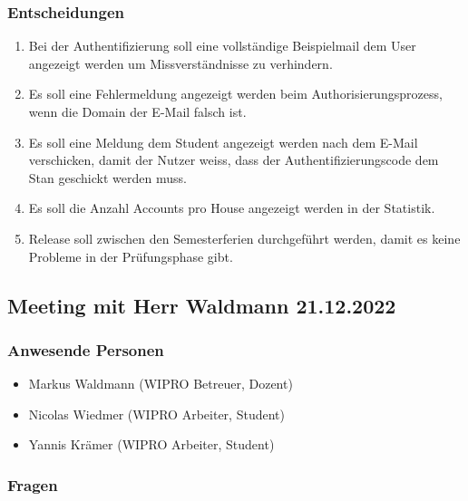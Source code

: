 \documentclass[a4paper, table]{article}
\begin{document}
\subsubsection*{Entscheidungen}

\begin{enumerate}
    \item Bei der Authentifizierung soll eine vollständige Beispielmail dem User angezeigt werden um Missverständnisse zu verhindern.
    \item Es soll eine Fehlermeldung angezeigt werden beim Authorisierungsprozess, wenn die Domain der E-Mail falsch ist.
    \item Es soll eine Meldung dem Student angezeigt werden nach dem E-Mail verschicken, damit der Nutzer weiss, dass der Authentifizierungscode dem Stan geschickt werden muss.
    \item Es soll die Anzahl Accounts pro House angezeigt werden in der Statistik.
    \item Release soll zwischen den Semesterferien durchgeführt werden, damit es keine Probleme in der Prüfungsphase gibt.
\end{enumerate}

\newpage
\subsection{Meeting mit Herr Waldmann 21.12.2022}

\subsubsection*{Anwesende Personen}

\begin{itemize}
    \item Markus Waldmann (WIPRO Betreuer, Dozent)
    \item Nicolas Wiedmer (WIPRO Arbeiter, Student)
    \item Yannis Krämer (WIPRO Arbeiter, Student)
\end{itemize}

\subsubsection*{Fragen}
\end{document}
